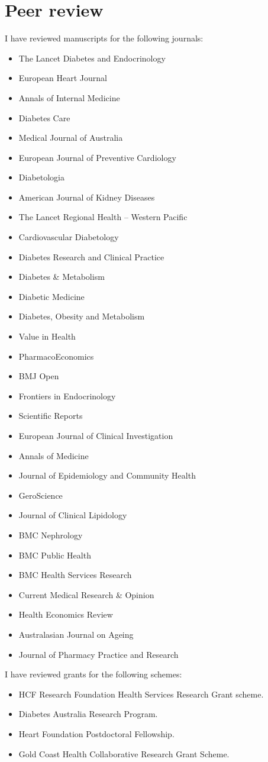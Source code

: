 \documentclass[11pt]{article}
\begin{document}
\section*{Peer review}
I have reviewed manuscripts for the following journals:
\begin{itemize}
\item The Lancet Diabetes and Endocrinology 
\item European Heart Journal 
\item Annals of Internal Medicine
\item Diabetes Care 
\item Medical Journal of Australia 
\item European Journal of Preventive Cardiology
\item Diabetologia 
\item American Journal of Kidney Diseases 
\item The Lancet Regional Health – Western Pacific 
\item Cardiovascular Diabetology 
\item Diabetes Research and Clinical Practice 
\item Diabetes \& Metabolism 
\item Diabetic Medicine 
\item Diabetes, Obesity and Metabolism 
\item Value in Health 
\item PharmacoEconomics 
\item BMJ Open 
\item Frontiers in Endocrinology 
\item Scientific Reports 
\item European Journal of Clinical Investigation 
\item Annals of Medicine 
\item Journal of Epidemiology and Community Health 
\item GeroScience
\item Journal of Clinical Lipidology 
\item BMC Nephrology 
\item BMC Public Health 
\item BMC Health Services Research 
\item Current Medical Research  \& Opinion 
\item Health Economics Review 
\item Australasian Journal on Ageing
\item Journal of Pharmacy Practice and Research \\
\end{itemize}

I have reviewed grants for the following schemes:
\begin{itemize}
\item HCF Research Foundation Health Services Research Grant scheme. 
\item Diabetes Australia Research Program. 
\item Heart Foundation Postdoctoral Fellowship. 
\item Gold Coast Health Collaborative Research Grant Scheme.
\end{itemize}
\end{document}
